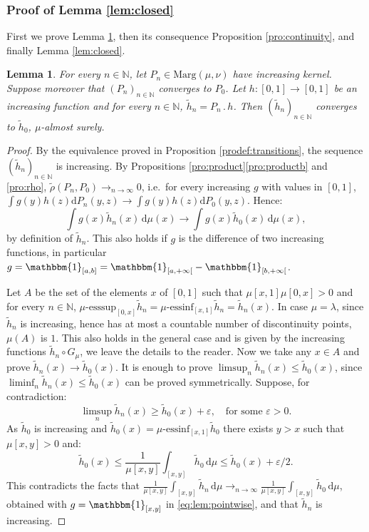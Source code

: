 \documentclass[10pt,a4paper]{article}
\providecommand{\ie}{i.e.\ }
\newcommand{\ldot}{\mathbin{.}}
\theoremstyle{plain}
\newtheorem{lem}[them]{Lemma}
\theoremstyle{definition}
\newcommand{\dd}{\mathrm{d}}
\newcommand{\one}{\mathbbm{1}}
\let\eps\varepsilon
\newcommand{\la}{\lambda}
\newcommand{\ma}{\mathrm{Marg}}
\newcommand{\N}{\mathbb{N}}
\newcommand{\clo}{\mathclose}
\begin{document}
\subsubsection{Proof of Lemma \ref{lem:closed}}\label{subsec:MaInProcess}
First we prove Lemma \ref{lem:pointwise}, then its consequence Proposition \ref{pro:continuity}, and finally Lemma \ref{lem:closed}.

\begin{lem}\label{lem:pointwise}
For every $n\in \N$, let $P_n\in \ma(\mu,\nu)$ have increasing kernel. Suppose moreover that $(P_n)_{n\in\N}$ converges to $P_0$. Let $h:[0,1]\to [0,1]$ be an increasing function and for every $n\in \N$, $\tilde{h}_n=P_{n}{}\ldot h$. Then $(\tilde h_n)_{n\in\N}$ converges to $\tilde h_0$, $\mu$-almost surely.
\end{lem}
\begin{proof}By the equivalence proved in Proposition \ref{prodef:transitions}, the sequence $(\tilde h_n)_{n\in \N}$ is increasing. By Propositions \ref{pro:product}\eqref{pro:productb} and \ref{pro:rho}, $\tilde{\rho}(P_n,P_0)\to_{n\to\infty} 0$, \ie for every increasing $g$ with values in $[0,1]$, $\int g(y)h(z) \dd P_n(y,z)\to \int g(y)h(z)\dd P_0(y,z)$. Hence:\vspace*{-3pt}%
\begin{equation}\label{eq:lem:pointwise}
\int g(x)\tilde{h}_n(x)\,\dd \mu(x)\to \int g(x)\tilde{h}_0(x)\,\dd \mu(x),
\end{equation}
by definition of $\tilde h_n$. This also holds if $g$ is the difference of two increasing functions, in particular $g=\one_{[a,b]}=\one_{[a,+\infty\clo[}-\one_{[b,+\infty\clo[}$.

Let $A$ be the set of the elements $x$ of $[0,1]$ such that $\mu[x,1]\mu[0,x]>0$ and for every $n\in \N$, $\mu\text{-}\mathrm{esssup}_{[0,x]}\tilde{h}_n=\mu\text{-}\mathrm{essinf}_{[x,1]}\tilde{h}_n=\tilde{h}_n(x)$. In case $\mu=\la$, since $\tilde h_n$ is increasing, hence has at most a countable number of discontinuity points, $\mu(A)$ is $1$. This also holds in the general case and is given by the increasing functions $\tilde{h}_n\circ G_\mu$, we leave the details to the reader. Now we take any $x\in A$ and prove $\tilde h_n(x)\to\tilde h_0(x)$. It is enough to prove $\limsup_{n}\tilde{h}_n(x)\leq \tilde{h}_0(x)$, since $\liminf_{n}\tilde{h}_n(x)\leq \tilde{h}_0(x)$ can be proved symmetrically. Suppose, for contradiction:\vspace*{-3pt}
\[\limsup_{n}\tilde{h}_n(x)\geq \tilde{h}_0(x)+\eps,\quad \text{for some $\eps>0$.}\]
As $\tilde{h}_{0}$ is increasing and $\tilde{h}_0(x)=\mu\text{-}\mathrm{essinf}_{[x,1]}\tilde{h}_0$ there exists $y>x$ such that $\mu[x,y]>0$ and:\vspace*{-3pt}
\[\tilde{h}_0(x)\leq\frac1{\mu[x,y]} \int_{[x,y]}\tilde{h}_0\,\dd\mu\leq \tilde{h}_0(x)+\eps/2.\]
This contradicts the facts that $\frac1{\mu[x,y]} \int_{[x,y]}\tilde{h}_n\,\dd\mu\to_{n\to\infty}\frac1{\mu[x,y]} \int_{[x,y]}\tilde{h}_0\,\dd\mu$, obtained with $g=\one_{[x,y]}$ in \eqref{eq:lem:pointwise}, and that $\tilde h_n$ is increasing.
\end{proof}
\end{document}
